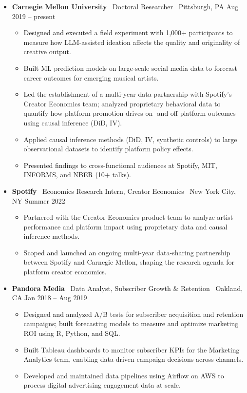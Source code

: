 \documentclass[10pt,letterpaper]{article}
\newcommand{\sep}{{\color{gray}\,\textbullet\,\,}}
\begin{document}
\begin{itemize}
\item \textbf{Carnegie Mellon University} \sep Doctoral Researcher \sep Pittsburgh, PA \hfill Aug 2019 -- present
  \begin{itemize}[label={}]
  \item Designed and executed a field experiment with 1,000+ participants to measure how LLM-assisted ideation affects the quality and originality of creative output.
  \item Built ML prediction models on large-scale social media data to forecast career outcomes for emerging musical artists.
  \item Led the establishment of a multi-year data partnership with Spotify's Creator Economics team; analyzed proprietary behavioral data to quantify how platform promotion drives on- and off-platform outcomes using causal inference (DiD, IV).
  \item Applied causal inference methods (DiD, IV, synthetic controls) to large observational datasets to identify platform policy effects.
  \item Presented findings to cross-functional audiences at Spotify, MIT, INFORMS, and NBER (10+ talks).
  \end{itemize}
\item \textbf{Spotify} \sep Economics Research Intern, Creator Economics \sep New York City, NY \hfill Summer 2022
  \begin{itemize}[label={}]
  \item Partnered with the Creator Economics product team to analyze artist performance and platform impact using proprietary data and causal inference methods.
  \item Scoped and launched an ongoing multi-year data-sharing partnership between Spotify and Carnegie Mellon, shaping the research agenda for platform creator economics.
  \end{itemize}
\item \textbf{Pandora Media} \sep Data Analyst, Subscriber Growth \& Retention \sep Oakland, CA \hfill Jan 2018 -- Aug 2019
  \begin{itemize}[label={}]
  \item Designed and analyzed A/B tests for subscriber acquisition and retention campaigns; built forecasting models to measure and optimize marketing ROI using R, Python, and SQL.
  \item Built Tableau dashboards to monitor subscriber KPIs for the Marketing Analytics team, enabling data-driven campaign decisions across channels.
  \item Developed and maintained data pipelines using Airflow on AWS to process digital advertising engagement data at scale.
  \end{itemize}
\end{itemize}
\end{document}
